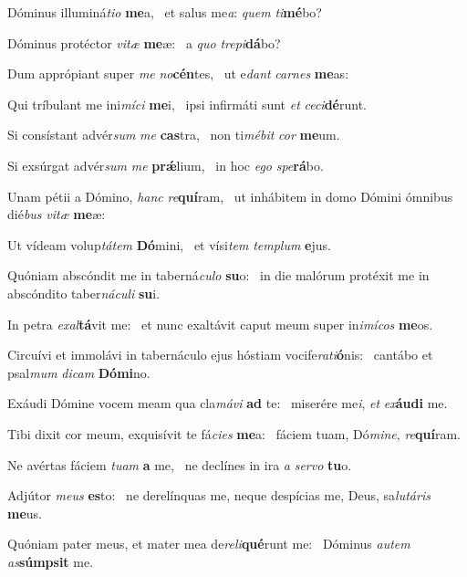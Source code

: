 \item Dóminus illuminá\textit{tio} \textbf{me}a,~\psstar{} et salus me\textit{a}: \textit{quem} \textit{ti}\textbf{mé}bo?
\item Dóminus protéctor \textit{vitæ} \textbf{me}æ:~\psstar{} a \textit{quo} \textit{trepi}\textbf{dá}bo?
\item Dum apprópiant super \textit{me} \textit{no}\textbf{cén}tes,~\psstar{} ut e\textit{dant} \textit{carnes} \textbf{me}as:
\item Qui tríbulant me ini\textit{míci} \textbf{me}i,~\psstar{} ipsi infirmáti sunt \textit{et} \textit{ceci}\textbf{dé}runt.
\item Si consístant advér\textit{sum} \textit{me} \textbf{cas}tra,~\psstar{} non ti\textit{mébit} \textit{cor} \textbf{me}um.
\item Si exsúrgat advér\textit{sum} \textit{me} \textbf{prǽ}lium,~\psstar{} in hoc \textit{ego} \textit{spe}\textbf{rá}bo.
\item Unam pétii a Dómino, \textit{hanc} \textit{re}\textbf{quí}ram,~\psstar{} ut inhábitem in domo Dómini ómnibus dié\textit{bus} \textit{vitæ} \textbf{me}æ:
\item Ut vídeam volup\textit{tátem} \textbf{Dó}mini,~\psstar{} et vísi\textit{tem} \textit{templum} \textbf{e}jus.
\item Quóniam abscóndit me in taberná\textit{culo} \textbf{su}o:~\psstar{} in die malórum protéxit me in abscóndito taber\textit{náculi} \textbf{su}i.
\item In petra \textit{exal}\textbf{tá}vit me:~\psstar{} et nunc exaltávit caput meum super in\textit{imícos} \textbf{me}os.
\item Circuívi et immolávi in tabernáculo ejus hóstiam vocife\textit{rati}\textbf{ó}nis:~\psstar{} cantábo et psal\textit{mum} \textit{dicam} \textbf{Dó}\textbf{mi}no.
\item Exáudi Dómine vocem meam qua cla\textit{mávi} \textbf{ad} te:~\psstar{} miserére me\textit{i}, \textit{et} \textit{ex}\textbf{áu}\textbf{di} me.
\item Tibi dixit cor meum, exquisívit te fá\textit{cies} \textbf{me}a:~\psstar{} fáciem tuam, Dó\textit{mine}, \textit{re}\textbf{quí}ram.
\item Ne avértas fáciem \textit{tuam} \textbf{a} me,~\psstar{} ne declínes in ira \textit{a} \textit{servo} \textbf{tu}o.
\item Adjútor \textit{meus} \textbf{es}to:~\psstar{} ne derelínquas me, neque despícias me, Deus, sa\textit{lutáris} \textbf{me}us.
\item Quóniam pater meus, et mater mea de\textit{reli}\textbf{qué}runt me:~\psstar{} Dóminus \textit{autem} \textit{as}\textbf{súmp}\textbf{sit} me.
